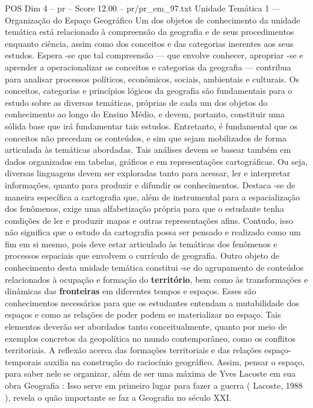 \begin{textsample}{POS Dim 4 – pr – Score 12.00 – pr/pr\_em\_97.txt}  \label{ex:f4_pos_183}
Unidade Temática 1 — Organização do Espaço Geográfico Um dos objetos de conhecimento da unidade temática está relacionado à compreensão da geografia e de seus procedimentos enquanto ciência, assim como dos conceitos e das categorias inerentes aos seus estudos.
Espera -se que tal compreensão — que envolve conhecer, apropriar -se e aprender a operacionalizar os conceitos e categorias da geografia — contribua para analisar processos políticos, econômicos, sociais, ambientais e culturais.
Os conceitos, categorias e princípios lógicos da geografia são fundamentais para o estudo sobre as diversas temáticas, próprias de cada um dos objetos do conhecimento ao longo do Ensino Médio, e devem, portanto, constituir uma sólida base que irá fundamentar tais estudos.
Entretanto, é fundamental que os conceitos não precedam os conteúdos, e sim que sejam mobilizados de forma articulada às temáticas abordadas.
Tais análises devem se basear também em dados organizados em tabelas, gráficos e em representações cartográficas.
Ou seja, diversas linguagens devem ser exploradas tanto para acessar, ler e interpretar informações, quanto para produzir e difundir os conhecimentos.
Destaca -se de maneira específica a cartografia que, além de instrumental para a espacialização dos fenômenos, exige uma alfabetização própria para que o estudante tenha condições de ler e produzir mapas e outras representações afins.
Contudo, isso não significa que o estudo da cartografia possa ser pensado e realizado como um fim em si mesmo, pois deve estar articulado às temáticas dos fenômenos e processos espaciais que envolvem o currículo de geografia.
Outro objeto de conhecimento desta unidade temática constitui -se do agrupamento de conteúdos relacionados à ocupação e formação do \textbf{território}, bem como às transformações e dinâmicas das \textbf{fronteiras} em diferentes tempos e espaços.
Esses são conhecimentos necessários para que os estudantes entendam a mutabilidade dos espaços e como as relações de poder podem se materializar no espaço.
Tais elementos deverão ser abordados tanto conceitualmente, quanto por meio de exemplos concretos da geopolítica no mundo contemporâneo, como os conflitos territoriais.
A reflexão acerca das formações territoriais e das relações espaço-temporais auxilia na construção do raciocínio geográfico.
Assim, pensar o espaço, para saber nele se organizar, além de ser uma máxima de Yves Lacoste em sua obra Geografia : Isso serve em primeiro lugar para fazer a guerra ( Lacoste, 1988 ), revela o quão importante se faz a Geografia no século XXI.

\end{textsample}
